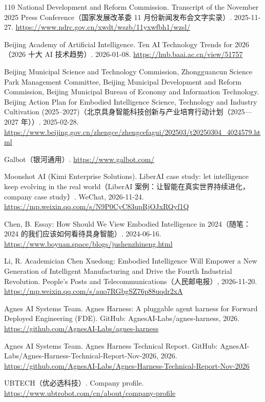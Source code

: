 \documentclass[10pt]{article}
\begin{document}
\begin{thebibliography}{110}
National Development and Reform Commission. Transcript of the November 2025 Press Conference（国家发展改革委 11 月份新闻发布会文字实录）. 2025-11-27. \url{https://www.ndrc.gov.cn/xwdt/wszb/11yxwfbh1/wzsl/}

Beijing Academy of Artificial Intelligence. Ten AI Technology Trends for 2026（2026 十大 AI 技术趋势）. 2026-01-08. \url{https://hub.baai.ac.cn/view/51757}

Beijing Municipal Science and Technology Commission, Zhongguancun Science Park Management Committee, Beijing Municipal Development and Reform Commission, Beijing Municipal Bureau of Economy and Information Technology. Beijing Action Plan for Embodied Intelligence Science, Technology and Industry Cultivation (2025--2027)（北京具身智能科技创新与产业培育行动计划（2025—2027 年））. 2025-02-28. \url{https://www.beijing.gov.cn/zhengce/zhengcefagui/202503/t20250304_4024579.html}

Galbot（银河通用）. \url{https://www.galbot.com/}

Moonshot AI (Kimi Enterprise Solutions). LiberAI case study: let intelligence keep evolving in the real world（LiberAI 案例：让智能在真实世界持续进化，company case study）. WeChat, 2026-11-24. \url{https://mp.weixin.qq.com/s/N9P0CyC83upRjOJxRQyf1Q}

Chen, B. Essay: How Should We View Embodied Intelligence in 2024（随笔：2024 的我们应该如何看待具身智能）. 2024-06-16. \url{https://www.boyuan.space/blogs/jushenzhineng.html}

Li, R. Academician Chen Xuedong: Embodied Intelligence Will Empower a New Generation of Intelligent Manufacturing and Drive the Fourth Industrial Revolution. People's Posts and Telecommunications（人民邮电报）, 2026-11-20. \url{https://mp.weixin.qq.com/s/auo7RGbgSZ76p88uqdr2xA}

Agnes AI Systems Team. Agnes Harness: A pluggable agent harness for Forward Deployed Engineering (FDE). GitHub: AgnesAI-Labs/agnes-harness, 2026. \url{https://github.com/AgnesAI-Labs/agnes-harness}

Agnes AI Systems Team. Agnes Harness Technical Report. GitHub: AgnesAI-Labs/Agnes-Harness-Technical-Report-Nov-2026, 2026. \url{https://github.com/AgnesAI-Labs/Agnes-Harness-Technical-Report-Nov-2026}

UBTECH（优必选科技）. Company profile. \url{https://www.ubtrobot.com/cn/about/company-profile}


\end{thebibliography}
\end{document}
